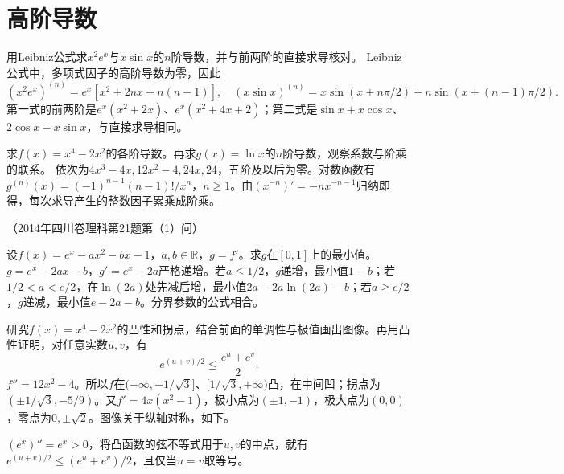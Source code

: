 \par\addvspace{12pt}

\section{高阶导数}

用Leibniz公式求\(x^2e^x\)与\(x\sin x\)的\(n\)阶导数，并与前两阶的直接求导核对。
\solutionanswer
Leibniz公式中，多项式因子的高阶导数为零，因此
\[
 (x^2e^x)^{(n)}=e^x[x^2+2nx+n(n-1)],\quad
 (x\sin x)^{(n)}=x\sin(x+n\pi/2)+n\sin(x+(n-1)\pi/2).
\]
第一式的前两阶是\(e^x(x^2+2x)\)、\(e^x(x^2+4x+2)\)；第二式是\(\sin x+x\cos x\)、\(2\cos x-x\sin x\)，与直接求导相同。


求\(f(x)=x^4-2x^2\)的各阶导数。再求\(g(x)=\ln x\)的\(n\)阶导数，观察系数与阶乘的联系。
\solutionanswer
依次为\(4x^3-4x,12x^2-4,24x,24\)，五阶及以后为零。对数函数有
\(g^{(n)}(x)=(-1)^{n-1}(n-1)!/x^n\)，\(n\ge1\)。由\((x^{-n})'=-nx^{-n-1}\)归纳即得，每次求导产生的整数因子累乘成阶乘。


（2014年四川卷理科第21题第（1）问）

设\(f(x)=e^x-ax^2-bx-1\)，\(a,b\in\mathbb R\)，\(g=f'\)。求\(g\)在\([0,1]\)上的最小值。
\solutionanswer
\(g=e^x-2ax-b\)，\(g'=e^x-2a\)严格递增。若\(a\le1/2\)，\(g\)递增，最小值\(1-b\)；若\(1/2<a<e/2\)，在\(\ln(2a)\)处先减后增，最小值\(2a-2a\ln(2a)-b\)；若\(a\ge e/2\)，\(g\)递减，最小值\(e-2a-b\)。分界参数的公式相合。


研究\(f(x)=x^4-2x^2\)的凸性和拐点，结合前面的单调性与极值画出图像。再用凸性证明，对任意实数\(u,v\)，有
\begin{equation*}
 e^{(u+v)/2}\le\frac{e^u+e^v}{2}.
\end{equation*}
\solutionanswer
\(f''=12x^2-4\)。所以\(f\)在\(( -\infty,-1/\sqrt3]\)、\([1/\sqrt3,+\infty)\)凸，在中间凹；拐点为\((\pm1/\sqrt3,-5/9)\)。又\(f'=4x(x^2-1)\)，极小点为\((\pm1,-1)\)，极大点为\((0,0)\)，零点为\(0,\pm\sqrt2\)。图像关于纵轴对称，如下。
\begin{center}
\end{center}
\((e^x)''=e^x>0\)，将凸函数的弦不等式用于\(u,v\)的中点，就有\(e^{(u+v)/2}\le(e^u+e^v)/2\)，且仅当\(u=v\)取等号。


